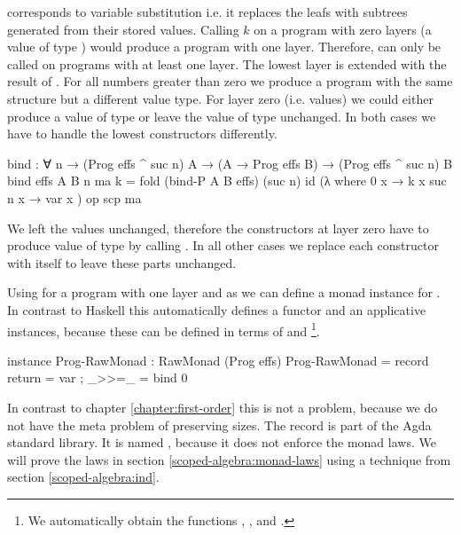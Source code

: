 \AgdaFunction{>>=} corresponds to variable substitution i.e. it replaces the
 leafs with subtrees generated from their stored
values.
Calling $k$ on a program with zero layers (a value of type )
would produce a program with one layer.
Therefore, \bind{} can only be called on programs with at least one layer.
The lowest layer is extended with the result of .
For all numbers greater than zero we produce a program with the same structure
but a different value type.
For layer zero (i.e. values) we could either produce a value of type 
\AgdaSpace{}\AgdaSpace{}
or leave the value of type  unchanged.
In both cases we have to handle the lowest 
constructors differently.

\begin{code}
bind : ∀ n → (Prog effs ^ suc n) A → (A → Prog effs B) →
  (Prog effs ^ suc n) B
bind {effs} {A} {B} n ma k = fold (bind-P A B effs) (suc n) id (λ where
    {0}      x → k x
    {suc n}  x → var x
  ) op scp ma
\end{code}
We left the values unchanged, therefore the 
constructors at layer zero have to produce value of type
\AgdaSpace{}\AgdaSpace{}
by calling .
In all other cases we replace each constructor with itself to leave these parts
unchanged.

Using \AgdaFunction{>>=} for a program with one layer and
 as  we can define a monad
instance for \AgdaSpace{}.
In contrast to Haskell this automatically defines a functor and an applicative
instances, because these can be defined in terms of \AgdaFunction{>>=} and
\footnote{We automatically obtain the functions
  \AgdaFunction{<\$>}, \AgdaFunction{<*>},  and
  \AgdaFunction{>>}. }.
\begin{code}
instance
  Prog-RawMonad : RawMonad (Prog effs)
  Prog-RawMonad = record { return = var ; _>>=_ = bind 0 }
\end{code}
In contrast to chapter \ref{chapter:first-order} this is not a problem, because
we do not have the meta problem of preserving sizes.
The record is part of the Agda standard library.
It is named , because it does not enforce the monad laws.
We will prove the laws in section \ref{scoped-algebra:monad-laws} using
a technique from section \ref{scoped-algebra:ind}.


